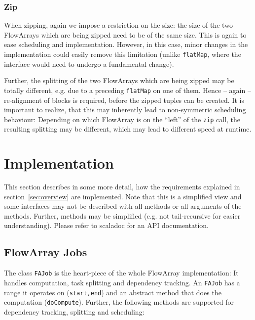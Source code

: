 \documentclass[runningheads,a4paper,fleqn]{llncs}
\begin{document}
\subsubsection{Zip}
When zipping, again we impose a restriction on the size: the size of
the two FlowArrays which are being zipped need to be of the same
size. This is again to ease scheduling and implementation. However, in
this case, minor changes in the implementation could easily remove
this limitation (unlike \texttt{flatMap}, where the interface would
need to undergo a fundamental change).

Further, the splitting of the two FlowArrays which are being zipped
may be totally different, e.g. due to a preceding \texttt{flatMap} on
one of them. Hence -- again -- re-alignment of blocks is required,
before the zipped tuples can be created. It is important to realize,
that this may inherently lead to non-symmetric scheduling behaviour:
Depending on which FlowArray is on the ``left'' of the \texttt{zip}
call, the resulting splitting may be different, which may lead to
different speed at runtime. 

\section{Implementation}
\label{sec:implementation}

This section describes in some more detail, how the requirements
explained in section~\ref{sec:overview} are implemented. Note that
this is a simplified view and some interfaces may not be described
with all methods or all arguments of the methods. Further, methods may
be simplified (e.g. not tail-recursive for easier
understanding). Please refer to scaladoc for an API documentation.

\subsection{FlowArray Jobs}
The class \texttt{FAJob} is the heart-piece of the whole FlowArray
implementation: It handles computation, task splitting and dependency
tracking. An \texttt{FAJob} has a range it operates on
(\texttt{start,end}) and an abstract method that does the computation
(\texttt{doCompute}). Further, the following methods are supported for
dependency tracking, splitting and scheduling:
\end{document}

